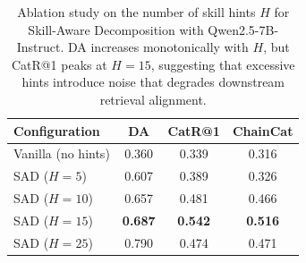

\begin{table}[t]
\centering
\small
\begin{tabular}{lccc}
\toprule
\textbf{Configuration} & \textbf{DA} & \textbf{CatR@1} & \textbf{ChainCat} \\
\midrule
Vanilla (no hints) & 0.360 & 0.339 & 0.316 \\
\midrule
SAD ($H{=}5$) & 0.607 & 0.389 & 0.326 \\
SAD ($H{=}10$) & 0.657 & 0.481 & 0.466 \\
SAD ($H{=}15$) & \textbf{0.687} & \textbf{0.542} & \textbf{0.516} \\
SAD ($H{=}25$) & 0.790 & 0.474 & 0.471 \\
\bottomrule
\end{tabular}
\caption{Ablation study on the number of skill hints $H$ for Skill-Aware Decomposition with Qwen2.5-7B-Instruct. DA increases monotonically with $H$, but CatR@1 peaks at $H{=}15$, suggesting that excessive hints introduce noise that degrades downstream retrieval alignment.}
\label{tab:sad-ablation}
\end{table}

